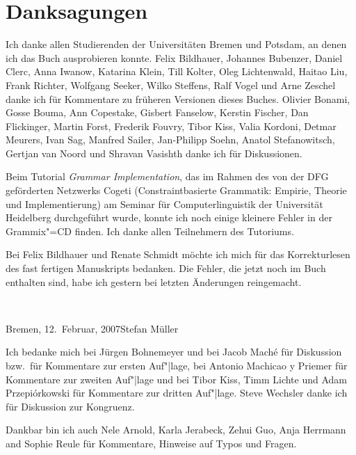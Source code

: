 
\chapter*{Danksagungen}

Ich danke allen Studierenden der Universitäten Bremen und Potsdam, 
an denen ich das Buch ausprobieren konnte.
Felix Bildhauer,
Johannes Bubenzer, %
Daniel Clerc, %
Anna Iwanow, %
Katarina Klein, 
Till Kolter, 
Oleg Lichtenwald, 
Haitao Liu,
Frank Richter,
Wolfgang Seeker,
Wilko Steffens,
Ralf Vogel
und
Arne Zeschel
danke ich für Kommentare zu früheren Versionen dieses Buches.
Olivier Bonami, %
Gosse Bouma, 
Ann Copestake, 
Gisbert Fanselow, 
Kerstin Fischer, 
Dan Flickinger, 
Martin Forst,
Frederik Fouvry,
Tibor Kiss, 
Valia Kordoni, 
Detmar Meurers, 
Ivan Sag, 
Manfred Sailer,       %
Jan-Philipp Soehn,    %
Anatol Stefanowitsch,
Gertjan van Noord
und
Shravan Vasishth %
danke ich für Diskussionen.

Beim Tutorial \emph{Grammar Implementation}, das im Rahmen des von der DFG geförderten Netzwerks
Cogeti (Constraintbasierte Grammatik: Empirie, Theorie und Implementierung) am Seminar für
Computerlinguistik der Universität Heidelberg durchgeführt wurde,
konnte ich noch einige kleinere Fehler in der Grammix"=CD finden. Ich danke allen Teilnehmern des Tutoriums.

Bei Felix Bildhauer und Renate Schmidt möchte ich mich für das Korrekturlesen des fast fertigen
Manuskripts bedanken. Die Fehler, die jetzt noch im Buch enthalten sind, habe ich gestern bei
letzten Änderungen reingemacht.

~\medskip

\noindent
Bremen, 12.\ Februar, 2007\hfill Stefan Müller


Ich bedanke mich bei Jürgen Bohnemeyer und bei Jacob Maché für Diskussion bzw.\ für Kommentare zur
ersten Auf"|lage, bei Antonio Machicao y Priemer für
Kommentare zur zweiten Auf"|lage und bei Tibor Kiss, Timm Lichte und Adam
Przepiórkowski für Kommentare zur dritten Auf"|lage. Steve Wechsler
danke ich für Diskussion zur Kongruenz.


Dankbar bin ich auch Nele Arnold, Karla Jerabeck, Zehui Guo, Anja Herrmann and Sophie Reule für Kommentare, Hinweise auf Typos und Fragen.

